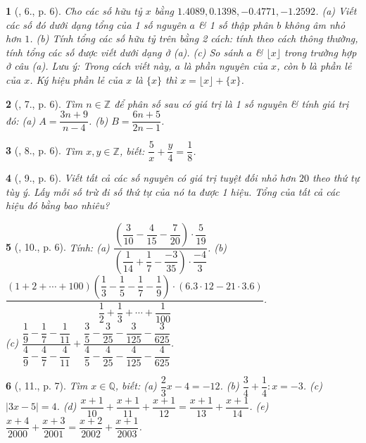 \documentclass{article}
\newtheorem{baitoan}{}
\begin{document}
\begin{baitoan}[\cite{Binh_Toan_7_tap_1}, 6., p. 6]
	Cho các số hữu tỷ $x$ bằng $1.4089, 0.1398, -0.4771, -1.2592$. (a) Viết các số đó dưới dạng tổng của 1 số nguyên $a$ \& 1 số thập phân $b$ không âm nhỏ hơn $1$. (b) Tính tổng các số hữu tỷ trên bằng 2 cách: tính theo cách thông thường, tính tổng các số được viết dưới dạng ở (a). (c) So sánh $a$ \& $\lfloor x\rfloor$ trong trường hợp ở câu (a). Lưu ý: Trong cách viết này, $a$ là \emph{phần nguyên} của $x$, còn $b$ là \emph{phần lẻ} của $x$. Ký hiệu phần lẻ của $x$ là $\{x\}$ thì $x = \lfloor x\rfloor + \{x\}$.
\end{baitoan}

\begin{baitoan}[\cite{Binh_Toan_7_tap_1}, 7., p. 6]
	Tìm $n\in\mathbb{Z}$ để phân số sau có giá trị là 1 số nguyên \& tính giá trị đó: (a) $A = \dfrac{3n + 9}{n - 4}$. (b) $B = \dfrac{6n + 5}{2n - 1}$.
\end{baitoan}

\begin{baitoan}[\cite{Binh_Toan_7_tap_1}, 8., p. 6]
	Tìm $x,y\in\mathbb{Z}$, biết: $\dfrac{5}{x} + \dfrac{y}{4} = \dfrac{1}{8}$.
\end{baitoan}

\begin{baitoan}[\cite{Binh_Toan_7_tap_1}, 9., p. 6]
	Viết tất cả các số nguyên có giá trị tuyệt đối nhỏ hơn $20$ theo thứ tự tùy ý. Lấy mỗi số trừ đi số thứ tự của nó ta được 1 hiệu. Tổng của tất cả các hiệu đó bằng bao nhiêu?
\end{baitoan}

\begin{baitoan}[\cite{Binh_Toan_7_tap_1}, 10., p. 6]
	Tính: (a) $\dfrac{\left(\dfrac{3}{10} - \dfrac{4}{15} - \dfrac{7}{20}\right)\cdot\dfrac{5}{19}}{\left(\dfrac{1}{14} + \dfrac{1}{7} - \dfrac{-3}{35}\right)\cdot\dfrac{-4}{3}}$. (b) $\dfrac{(1 + 2 + \cdots + 100)\left(\dfrac{1}{3} - \dfrac{1}{5} - \dfrac{1}{7} - \dfrac{1}{9}\right)\cdot(6.3\cdot 12 - 21\cdot 3.6)}{\dfrac{1}{2} + \dfrac{1}{3} + \cdots + \dfrac{1}{100}}$.\\(c) $\dfrac{\dfrac{1}{9} - \dfrac{1}{7} - \dfrac{1}{11}}{\dfrac{4}{9} - \dfrac{4}{7} - \dfrac{4}{11}} + \dfrac{\dfrac{3}{5} - \dfrac{3}{25} - \dfrac{3}{125} - \dfrac{3}{625}}{\dfrac{4}{5} - \dfrac{4}{25} - \dfrac{4}{125} - \dfrac{4}{625}}$.
\end{baitoan}

\begin{baitoan}[\cite{Binh_Toan_7_tap_1}, 11., p. 7]
	Tìm $x\in\mathbb{Q}$, biết: (a) $\dfrac{2}{3}x - 4 = -12$. (b) $\dfrac{3}{4} + \dfrac{1}{4}:x = -3$. (c) $|3x - 5| = 4$. (d) $\dfrac{x + 1}{10} + \dfrac{x + 1}{11} + \dfrac{x + 1}{12} = \dfrac{x + 1}{13} + \dfrac{x + 1}{14}$. (e) $\dfrac{x + 4}{2000} + \dfrac{x + 3}{2001} = \dfrac{x + 2}{2002} + \dfrac{x + 1}{2003}$.
\end{baitoan}
\end{document}
